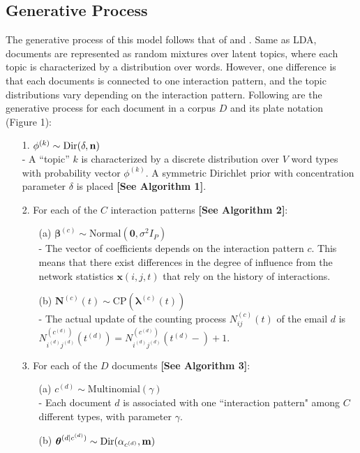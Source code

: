 \documentclass[a4paper]{article}
\begin{document}
\subsection{Generative Process}
The generative process of this model follows that of \cite{Blei2003} and \cite{rosen2004author}. Same as LDA, documents are represented as random mixtures over latent topics, where each topic is characterized by a distribution over words. However, one difference is that each documents is connected to one interaction pattern, and the topic distributions vary depending on the interaction pattern. Following are the generative process for each document in a corpus $D$ and its plate notation (Figure 1):
\begin{itemize}
	\item[1.] {$\phi^{(k)} \sim \mbox{Dir}(\delta, \bf n)$}\\
	- A “topic” $k$ is characterized by a discrete distribution over $V$ word types with probability vector $\phi^{(k)}$. A symmetric Dirichlet prior with concentration parameter $\delta$ is placed \textbf{[See Algorithm 1]}.
\item[2.] For each of the $C$ interaction patterns \textbf{[See Algorithm 2]}:
\begin{itemize}
	\item[(a)] $\boldsymbol{\beta}^{(c)}\sim \mbox{Normal}(\textbf{0}, \sigma^2I_P)$\\ 
	- The vector of coefficients depends on the interaction pattern $c$. This means that there exist differences in the degree of influence from the network statistics $\boldsymbol{x}(i, j, t)$ that rely on the history of interactions.
\item[(b)] $\boldsymbol{N}^{(c)}(t) \sim \mbox{CP}(\boldsymbol{\lambda}^{(c)}(t))$\\
- The actual update of the counting process $N^{(c)}_{ij}(t)$ of the email $d$ is  $N^{(c^{(d)})}_{i^{(d)}j^{(d)}}(t^{(d)})=N^{(c^{(d)})}_{i^{(d)}j^{(d)}}(t^{(d)}-)+1$.
\end{itemize}
\item[3.] For each of the $D$ documents \textbf{[See Algorithm 3]}:
\begin{itemize}
	\item[(a)] $c^{(d)}\sim \mbox{Multinomial}(\gamma)$\\
	- Each document $d$ is associated with one ``interaction pattern" among $C$ different types, with parameter $\gamma$.
	\item[(b)] $\boldsymbol{\theta}^{(d|c^{(d)})}\sim \mbox{Dir}(\alpha_{c^{(d)}}, \bf m)$\\

\end{itemize}
\end{itemize}
\end{document}
